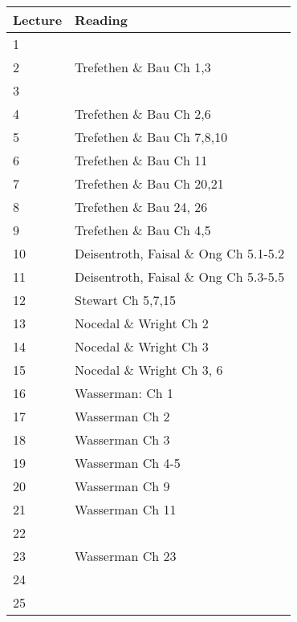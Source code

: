 \documentclass[11pt]{article}
\begin{document}
~\\
\small
\begin{centering}
\begin{tabular}{||l|p{3in}||}
\hline\hline
Lecture & Reading    \\
\hline\hline
1      &    \\
\hline
2     &   Trefethen \& Bau Ch 1,3  \\
\hline
3      &    \\
\hline
4 &  Trefethen \& Bau Ch 2,6   \\
\hline
5 &  Trefethen \& Bau Ch 7,8,10  \\
\hline
6 &  Trefethen \& Bau  Ch 11     \\
\hline 
7 &  Trefethen \& Bau Ch 20,21 \\
\hline 
8 & Trefethen \& Bau 24, 26    \\
\hline 
9 &   Trefethen \& Bau  Ch 4,5    \\
\hline 
10 &  Deisentroth, Faisal \& Ong Ch 5.1-5.2   \\
\hline 
11 &  Deisentroth, Faisal \& Ong Ch 5.3-5.5    \\
\hline 
12 &  Stewart Ch 5,7,15  \\
\hline 
13 &  Nocedal \& Wright Ch 2   \\
\hline 
14 &    Nocedal \& Wright Ch 3  \\
\hline 
15 & Nocedal \& Wright Ch 3, 6    \\
\hline 
16 & Wasserman: Ch 1 \\
\hline 
17 &  Wasserman Ch 2     \\
\hline 
18 &  Wasserman Ch 3 \\
\hline 
19 & Wasserman Ch 4-5\  \\
\hline 
20 &    Wasserman Ch 9   \\
\hline 
21 &   Wasserman Ch 11    \\
\hline 
22 &     \\
\hline 
23 &  Wasserman Ch 23  \\
\hline 
24 &   \\
\hline 
25 &   \\
\hline
\hline

\end{tabular}\\
\end{centering}
\end{document}
